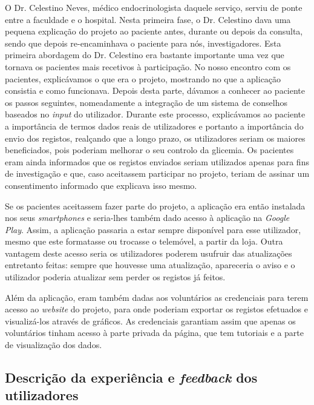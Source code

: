 O Dr. Celestino Neves, médico endocrinologista daquele serviço, serviu de ponte entre a faculdade e o hospital. Nesta primeira fase, o Dr. Celestino dava uma pequena explicação do projeto ao paciente antes, durante ou depois da consulta, sendo que depois re-encaminhava o paciente para nós, investigadores. Esta primeira abordagem do Dr. Celestino era bastante importante uma vez que tornava os pacientes mais recetivos à participação. No nosso encontro com os pacientes, explicávamos o que era o projeto, mostrando no que a aplicação consistia e como funcionava. Depois desta parte, dávamos a conhecer ao paciente os passos seguintes, nomeadamente a integração de um sistema de conselhos baseados no \textit{input} do utilizador. Durante este processo, explicávamos ao paciente a importância de termos dados reais de utilizadores e portanto a importância do envio dos registos, realçando que a longo prazo, os utilizadores seriam os maiores beneficiados, pois poderiam melhorar o seu controlo da glicemia. Os pacientes eram ainda informados que os registos enviados seriam utilizados apenas para fins de investigação e que, caso aceitassem participar no projeto, teriam de assinar um consentimento informado que explicava isso mesmo.

Se os pacientes aceitassem fazer parte do projeto, a aplicação era então instalada nos seus \textit{smartphones} e seria-lhes também dado acesso à aplicação na \textit{Google Play}. Assim, a aplicação passaria a estar sempre disponível para esse utilizador, mesmo que este formatasse ou trocasse o telemóvel, a partir da loja. Outra vantagem deste acesso seria os utilizadores poderem usufruir das atualizações entretanto feitas: sempre que houvesse uma atualização, apareceria o aviso e o utilizador poderia atualizar sem perder os registos já feitos.

Além da aplicação, eram também dadas aos voluntários as credenciais para terem acesso ao \textit{website} do projeto, para onde poderiam exportar os registos efetuados e visualizá-los através de gráficos. As credenciais garantiam assim que apenas os voluntários tinham acesso à parte privada da página, que tem tutoriais e a parte de visualização dos dados.


\subsection{Descrição da experiência e \textit{feedback} dos utilizadores}

